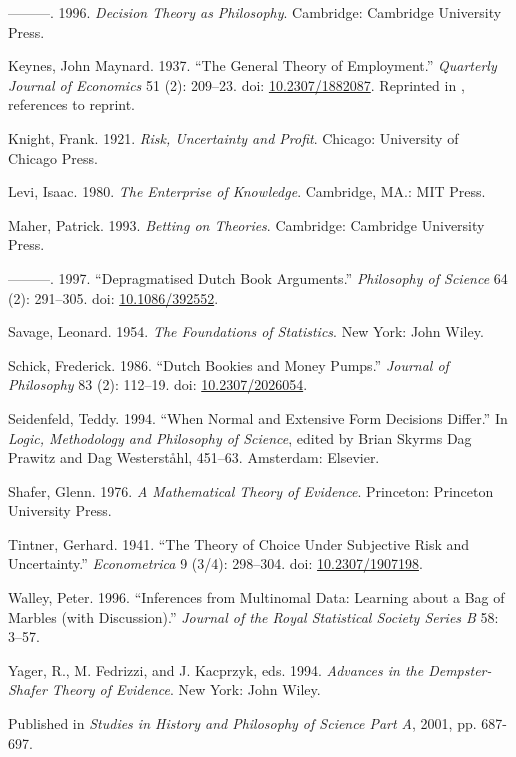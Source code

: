\documentclass[
  10pt,
  letterpaper,
  DIV=11,
  numbers=noendperiod,
  twoside]{scrartcl}
\newlength{\cslhangindent}
\newenvironment{CSLReferences}[2] %
 {\begin{list}{}{%
  \setlength{\itemindent}{0pt}
  \setlength{\leftmargin}{0pt}
  \setlength{\parsep}{0pt}
  \ifodd #1
   \setlength{\leftmargin}{\cslhangindent}
   \setlength{\itemindent}{-1\cslhangindent}
  \fi
  \setlength{\itemsep}{#2\baselineskip}}}
 {\end{list}}
\begin{document}
\begin{CSLReferences}{1}{0}
---------. 1996. \emph{Decision Theory as Philosophy}. Cambridge:
Cambridge University Press.

Keynes, John Maynard. 1937. {``The General Theory of Employment.''}
\emph{Quarterly Journal of Economics} 51 (2): 209--23. doi:
\href{https://doi.org/10.2307/1882087}{10.2307/1882087}. Reprinted in
\cite[XIV 109-123]{KeynesCW}, references to reprint.

Knight, Frank. 1921. \emph{Risk, Uncertainty and Profit}. Chicago:
University of Chicago Press.

Levi, Isaac. 1980. \emph{The Enterprise of Knowledge}. Cambridge, MA.:
MIT Press.

Maher, Patrick. 1993. \emph{Betting on Theories}. Cambridge: Cambridge
University Press.

---------. 1997. {``Depragmatised Dutch Book Arguments.''}
\emph{Philosophy of Science} 64 (2): 291--305. doi:
\href{https://doi.org/10.1086/392552}{10.1086/392552}.

Savage, Leonard. 1954. \emph{The Foundations of Statistics}. New York:
John Wiley.

Schick, Frederick. 1986. {``Dutch Bookies and Money Pumps.''}
\emph{Journal of Philosophy} 83 (2): 112--19. doi:
\href{https://doi.org/10.2307/2026054}{10.2307/2026054}.

Seidenfeld, Teddy. 1994. {``When Normal and Extensive Form Decisions
Differ.''} In \emph{Logic, Methodology and Philosophy of Science},
edited by Brian Skyrms Dag Prawitz and Dag Westerståhl, 451--63.
Amsterdam: Elsevier.

Shafer, Glenn. 1976. \emph{A Mathematical Theory of Evidence}.
Princeton: Princeton University Press.

Tintner, Gerhard. 1941. {``The Theory of Choice Under Subjective Risk
and Uncertainty.''} \emph{Econometrica} 9 (3/4): 298--304. doi:
\href{https://doi.org/10.2307/1907198}{10.2307/1907198}.

Walley, Peter. 1996. {``Inferences from Multinomal Data: Learning about
a Bag of Marbles (with Discussion).''} \emph{Journal of the Royal
Statistical Society Series B} 58: 3--57.

Yager, R., M. Fedrizzi, and J. Kacprzyk, eds. 1994. \emph{Advances in
the Dempster- Shafer Theory of Evidence}. New York: John Wiley.

\end{CSLReferences}



\noindent Published in\emph{
Studies in History and Philosophy of Science Part A}, 2001, pp. 687-697.
\end{document}
